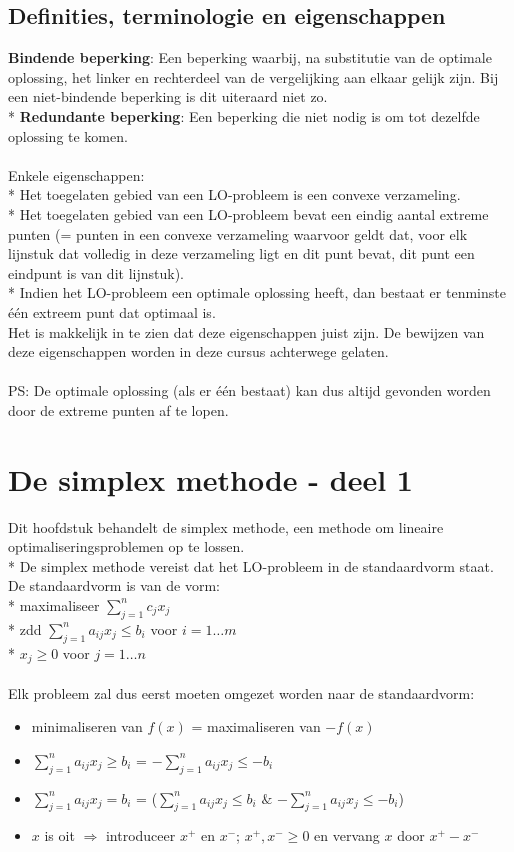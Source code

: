 \documentclass[10pt]{article}
\begin{document}
\subsection{Definities, terminologie en eigenschappen}
\textbf{Bindende beperking}: Een beperking waarbij, na substitutie van de optimale oplossing, het linker en rechterdeel van de vergelijking aan elkaar gelijk zijn. Bij een niet-bindende beperking is dit uiteraard niet zo.\\*
\textbf{Redundante beperking}: Een beperking die niet nodig is om tot dezelfde oplossing te komen.\\\\
Enkele eigenschappen:\\*
Het toegelaten gebied van een LO-probleem is een convexe verzameling.\\*
Het toegelaten gebied van een LO-probleem bevat een eindig aantal extreme punten (= punten in een convexe verzameling waarvoor geldt dat, voor elk lijnstuk dat volledig in deze verzameling ligt en dit punt bevat, dit punt een eindpunt is van dit lijnstuk).\\*
Indien het LO-probleem een optimale oplossing heeft, dan bestaat er tenminste \'e\'en extreem punt dat optimaal is.\\
Het is makkelijk in te zien dat deze eigenschappen juist zijn. De bewijzen van deze eigenschappen worden in deze cursus achterwege gelaten.\\\\
PS: De optimale oplossing (als er \'e\'en bestaat) kan dus altijd gevonden worden door de extreme punten af te lopen.
\section{De simplex methode - deel 1}
Dit hoofdstuk behandelt de simplex methode, een methode om lineaire optimaliseringsproblemen op te lossen.\\*
De simplex methode vereist dat het LO-probleem in de standaardvorm staat. De standaardvorm is van de vorm:\\*
maximaliseer $\sum_{j=1}^nc_jx_j$\\*
zdd $\sum_{j=1}^na_{ij}x_j \le b_i$ voor $i = 1 \dots m$\\*
$x_j \ge 0$ voor $j = 1 \dots n$\\\\
Elk probleem zal dus eerst moeten omgezet worden naar de standaardvorm:
\begin{itemize}
\item minimaliseren van $f(x)$ = maximaliseren van $-f(x)$
\item $\sum_{j=1}^na_{ij}x_j \ge b_i$ = $-\sum_{j=1}^na_{ij}x_j \le -b_i$
\item $\sum_{j=1}^na_{ij}x_j = b_i$ = ($\sum_{j=1}^na_{ij}x_j \le b_i$ $\&$ $-\sum_{j=1}^na_{ij}x_j \le -b_i$)
\item $x$ is oit $\Rightarrow$ introduceer $x^+$ en $x^-$; $x^+, x^- \ge 0$ en vervang $x$ door $x^+ - x^-$
\end{itemize}
\end{document}
